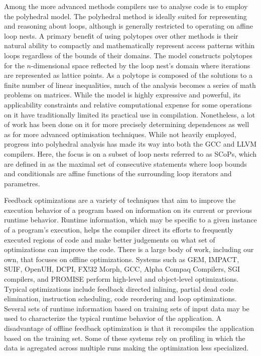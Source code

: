 Among the more advanced methods compilers use to analyse code is to employ the polyhedral model\cite{Cousot:1978:ADL:512760.512770}\cite{Bagnara:2009:APC:1628316.1628385}\cite{benabderrahmane.10.cc}.
The polyhedral method is ideally suited for representing and reasoning about loops, although is generally restricted to operating on affine loop nests.
A primary benefit of using polytopes over other methods is their natural ability to compactly and mathematically represent access patterns within loops regardless of the bounds of their domains.
The model constructs polytopes for the $n$-dimensional space reflected by the loop nest's domain where iterations are represented as lattice points.
As a polytope is composed of the solutions to a finite number of linear inequalities, much of the analysis becomes a series of math problems on matrices.
While the model is highly expressive and powerful, its applicability constraints and relative computational expense for some operations on it have traditionally limited its practical use in compilation\cite{DBLP:journals/entcs/Simon10a}.
Nonetheless, a lot of work has been done on it for more precisely determining dependences\cite{Vasilache:2006:VDA:1183401.1183448} as well as for more advanced optimisation techniques\cite{Nieuwenhuizen2014AutovectorizationUP}\cite{5260526}.
While not heavily employed, progress into polyhedral analysis has made its way into both the \ac{GCC}\cite{trifunovic:inria-00551516} and LLVM\cite{grosser.11.impact} compilers.
Here, the focus is on a subset of loop nests referred to as \acp{SCoP}\cite{TBas}, which are defined in \cite{benabderrahmane.10.cc} as the maximal set of consecutive statements where loop bounds and conditionals are affine functions of the surrounding loop iterators and parametres.

Feedback optimizations are a variety  of techniques that aim to improve
the execution behavior of a program based on information on its current or
previous runtime behavior\cite{Smith:2000:OCF:351403.351408}. Runtime
information, which may be specific to a given instance of a program's
execution, helps the compiler direct its efforts to frequently
executed regions of code and make better judgements on what set of
optimizations can  improve the code.  There is a large body of work, including
our own\cite{10.1007/978-3-540-68555-5_22}, that  focuses on offline optimizations. Systems such as GEM,
IMPACT, SUIF, OpenUH, DCPI, FX!32 Morph, GCC, Alpha Compaq Compilers, SGI compilers, and PROMISE
perform high-level and object-level optimizations. Typical optimizations include
feedback directed inlining, partial dead code elimination,
instruction scheduling, code reordering and loop optimizations.
Several sets of  runtime information based on training sets of input data may be used to characterize the typical runtime behavior of the application.
A disadvantage of offline feedback optimization is that it recompiles the application based on the training set. Some of these
systems rely on profiling in which the data is agregated across multiple runs making the optimization
less specialized.

